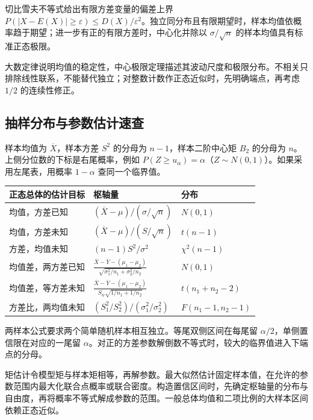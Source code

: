 \documentclass[UTF8,fontset=none,zihao=-4,a4paper]{ctexart}
\begin{document}
切比雪夫不等式给出有限方差变量的偏差上界 $P(|X-E(X)|\ge\varepsilon)\le D(X)/\varepsilon^2$。独立同分布且有限期望时，样本均值依概率趋于期望；进一步有正的有限方差时，中心化并除以 $\sigma/\sqrt n$ 的样本均值具有标准正态极限。

大数定律说明均值的稳定性，中心极限定理描述其波动尺度和极限分布。不相关只排除线性联系，不能替代独立；对整数计数作正态近似时，先明确端点，再考虑 $1/2$ 的连续性修正。

\subsection{抽样分布与参数估计速查}
样本均值为 $\overline X$，样本方差 $S^2$ 的分母为 $n-1$，样本二阶中心矩 $B_2$ 的分母为 $n$。上侧分位数的下标是右尾概率，例如 $P(Z\ge u_\alpha)=\alpha$（$Z\sim N(0,1)$）。如果采用左尾表，用概率 $1-\alpha$ 查同一个临界值。

\begin{center}\begin{tabularx}{\linewidth}{l Y l}
\toprule 正态总体的估计目标 & 枢轴量 & 分布\\\midrule
均值，方差已知 & $(\overline X-\mu)/(\sigma/\sqrt n)$ & $N(0,1)$\\
均值，方差未知 & $(\overline X-\mu)/(S/\sqrt n)$ & $t(n-1)$\\
方差，均值未知 & $(n-1)S^2/\sigma^2$ & $\chi^2(n-1)$\\
均值差，两方差已知 & $\displaystyle\frac{\overline X-\overline Y-(\mu_1-\mu_2)}
{\sqrt{\sigma_1^2/n_1+\sigma_2^2/n_2}}$ & $N(0,1)$\\
均值差，等方差未知 & $\displaystyle\frac{\overline X-\overline Y-(\mu_1-\mu_2)}
{S_w\sqrt{1/n_1+1/n_2}}$ & $t(n_1+n_2-2)$\\
方差比，两均值未知 & $(S_1^2/S_2^2)/(\sigma_1^2/\sigma_2^2)$ & $F(n_1-1,n_2-1)$\\\bottomrule
\end{tabularx}\end{center}
两样本公式要求两个简单随机样本相互独立。等尾双侧区间在每尾留 $\alpha/2$，单侧置信限在对应的一尾留 $\alpha$。对正的方差参数解倒数不等式时，较大的临界值进入下端点的分母。

矩估计令模型矩与样本矩相等，再解参数。最大似然估计固定样本值，在允许的参数范围内最大化联合点概率或联合密度。构造置信区间时，先确定枢轴量的分布与自由度，再将概率不等式解成参数的范围。一般总体均值和二项比例的大样本区间依赖正态近似。
\end{document}
